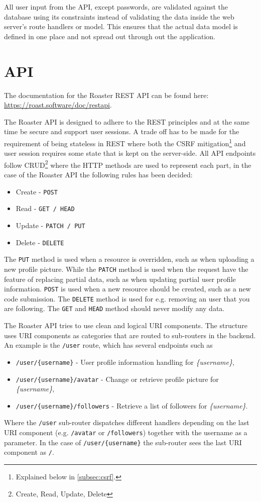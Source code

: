 \documentclass[12pt,a4paper]{report}
\begin{document}
All user input from the API, except passwords, are validated against the database using its constraints instead of validating the data inside the web server's route handlers or model. This ensures that the actual data model is defined in one place and not spread out through out the application.

\section{API}
\label{sec:api-design}
The documentation for the Roaster REST API can be found here: \\ \url{https://roast.software/doc/restapi}.

The Roaster API is designed to adhere to the REST principles and at the same time be secure and support user sessions. A trade off has to be made for the requirement of being stateless in REST\cite{fielding-rest} where both the CSRF mitigation\footnote{Explained below in \autoref{subsec:csrf}.} and user session requires some state that is kept on the server-side. All API endpoints follow CRUD\footnote{Create, Read, Update, Delete} where the HTTP methods are used to represent each part, in the case of the Roaster API the following rules has been decided:
\begin{itemize}
    \item Create - \texttt{POST}
    \item Read - \texttt{GET / HEAD}
    \item Update - \texttt{PATCH / PUT}
    \item Delete - \texttt{DELETE}
\end{itemize}
The \texttt{PUT} method is used when a resource is overridden, such as when uploading a new profile picture. While the \texttt{PATCH} method is used when the request have the feature of replacing partial data, such as when updating partial user profile information. \texttt{POST} is used when a new resource should be created, such as a new code submission. The \texttt{DELETE} method is used for e.g. removing an user that you are following. The \texttt{GET} and \texttt{HEAD} method should never modify any data.

The Roaster API tries to use clean and logical URI components. The structure uses URI components as categories that are routed to sub-routers in the backend. An example is the \texttt{/user} route, which has several endpoints such as
\begin{itemize}
    \item \texttt{/user/\{username\}} - User profile information handling for \textit{\{username\}},
    \item \texttt{/user/\{username\}/avatar} - Change or retrieve profile picture for \textit{\{username\}},
    \item \texttt{/user/\{username\}/followers} - Retrieve a list of followers for \textit{\{username\}}.
\end{itemize}
Where the \texttt{/user} sub-router dispatches different handlers depending on the last URI component (e.g. \texttt{/avatar} or \texttt{/followers}) together with the username as a parameter. In the case of \texttt{/user/\{username\}} the sub-router sees the last URI component as \texttt{/}.
\end{document}
